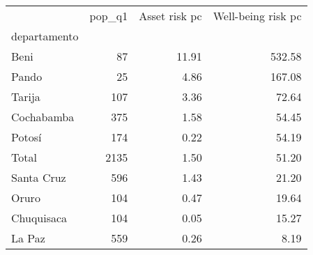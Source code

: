 \begin{tabular}{lrrr}
\toprule
{} &  pop\_q1 &  Asset risk pc &  Well-being risk pc \\
departamento &         &                &                     \\
\midrule
Beni         &      87 &          11.91 &              532.58 \\
Pando        &      25 &           4.86 &              167.08 \\
Tarija       &     107 &           3.36 &               72.64 \\
Cochabamba   &     375 &           1.58 &               54.45 \\
Potosí       &     174 &           0.22 &               54.19 \\
Total        &    2135 &           1.50 &               51.20 \\
Santa Cruz   &     596 &           1.43 &               21.20 \\
Oruro        &     104 &           0.47 &               19.64 \\
Chuquisaca   &     104 &           0.05 &               15.27 \\
La Paz       &     559 &           0.26 &                8.19 \\
\bottomrule
\end{tabular}
